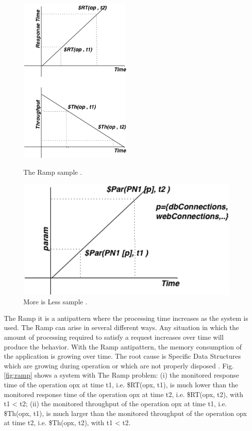 \begin{figure}[H]
\begin{minipage}{.5\textwidth}
\centering
\includegraphics[width=0.5\textwidth]{./images/ramp.png}
\caption{The Ramp sample \cite{Vetoio2011}.}
\label{fig:ramp}
\end{minipage}
\begin{minipage}{.5\textwidth}
\centering
\includegraphics[width=1\textwidth]{./images/moreisless.png}
\caption{More is Less sample \cite{Vetoio2011}.}
\label{fig:moreisless}
\end{minipage}
\end{figure}

The Ramp it is a antipattern where the processing time increases as the system is used. The Ramp can arise in several different ways. Any situation in which the amount of processing required to satisfy a request increases over time will produce the behavior. With the Ramp antipattern, the memory consumption of the application is growing over time. The root cause is Specific Data Structures which are growing during operation or which are not properly disposed \cite{Wert2014} \cite{Smith2003}. Fig. \ref{fig:ramp} shows a system  with The Ramp problem:  (i) the monitored response time of the operation opx at time t1, i.e. \$RT(opx, t1), is much lower than the monitored response time of the operation opx at time t2, i.e. \$RT(opx, t2), with t1 < t2; (ii) the monitored throughput of the operation opx at time t1, i.e. \$Th(opx, t1), is much larger than the monitored throughput of the operation opx at time t2, i.e. \$Th(opx, t2), with t1 < t2. 

